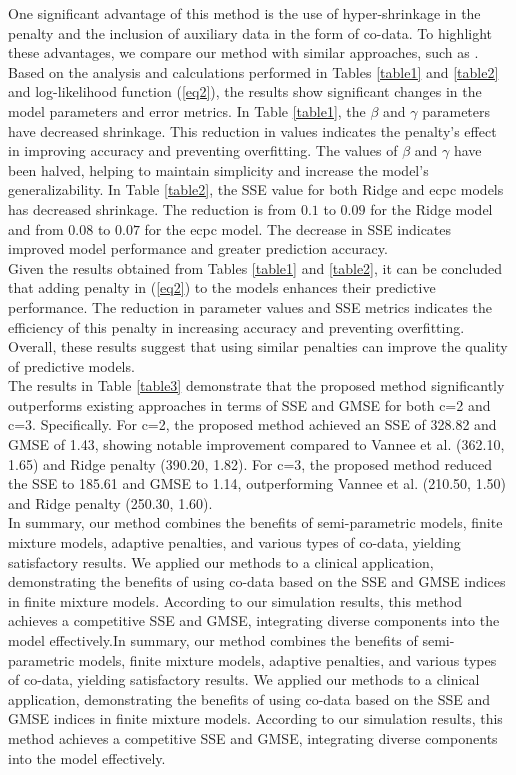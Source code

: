 One significant advantage of this method is the use of hyper-shrinkage in the penalty and the inclusion of auxiliary data in the form of co-data. To highlight these advantages, we compare our method with similar approaches, such as \hbox{\cite{Vannee2021}}.\\
Based on the analysis and calculations performed in Tables \ref{table1} and \ref{table2} and log-likelihood function (\ref{eq2}), the results show significant changes in the model parameters and error metrics. In Table \ref{table1}, the $ \beta $ and $ \gamma $ parameters have decreased shrinkage. This reduction in values indicates the penalty's effect in improving accuracy and preventing overfitting. The values of $ \beta $ and $ \gamma $ have been halved, helping to maintain simplicity and increase the model's generalizability. In Table \ref{table2}, the SSE value for both Ridge and ecpc models has decreased shrinkage. The reduction is from $ 0.1 $ to $ 0.09 $ for the Ridge model and from $ 0.08 $ to $ 0.07 $ for the ecpc model. The decrease in SSE indicates improved model performance and greater prediction accuracy.\\	
Given the results obtained from Tables \ref{table1} and \ref{table2}, it can be concluded that adding penalty in (\ref{eq2}) to the models enhances their predictive performance. The reduction in parameter values and SSE metrics indicates the efficiency of this penalty in increasing accuracy and preventing overfitting. Overall, these results suggest that using similar penalties can improve the quality of predictive models.\\
The results in Table \ref{table3} demonstrate that the proposed method significantly outperforms existing approaches in terms of SSE and GMSE for both c=2 and c=3. Specifically. For c=2, the proposed method achieved an SSE of 328.82 and GMSE of 1.43, showing notable improvement compared to Vannee et al. (362.10, 1.65) and Ridge penalty (390.20, 1.82). For c=3, the proposed method reduced the SSE to 185.61 and GMSE to 1.14, outperforming Vannee et al. (210.50, 1.50) and Ridge penalty (250.30, 1.60).\\
In summary, our method combines the benefits of semi-parametric models, finite mixture models, adaptive penalties, and various types of co-data, yielding satisfactory results. We applied our methods to a clinical application, demonstrating the benefits of using co-data based on the SSE and GMSE indices in finite mixture models. According to our simulation results, this method achieves a competitive SSE and GMSE, integrating diverse components into the model effectively.In summary, our method combines the benefits of semi-parametric models, finite mixture models, adaptive penalties, and various types of co-data, yielding satisfactory results. We applied our methods to a clinical application, demonstrating the benefits of using co-data based on the SSE and GMSE indices in finite mixture models. According to our simulation results, this method achieves a competitive SSE and GMSE, integrating diverse components into the model effectively.
